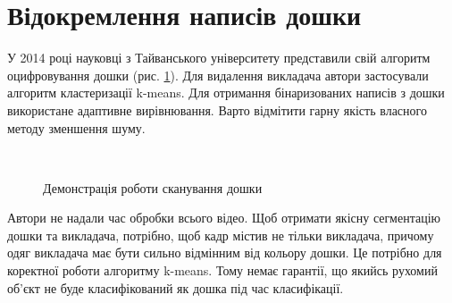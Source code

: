 \section{Відокремлення написів дошки}
У 2014 році науковці з Тайванського університету представили свій алгоритм \cite{yeh}
оцифровування дошки (рис. \ref{fig:yeh}). Для видалення викладача автори застосували
алгоритм кластеризації k-means. Для отримання бінаризованих написів з дошки
використане адаптивне вирівнювання. Варто відмітити гарну
якість власного методу зменшення шуму.
\begin{figure}[H]
  \centering
  \\
  \caption{Демонстрація роботи сканування дошки \cite{yeh}
    \label{fig:yeh}
  }
\end{figure}
Автори не надали час обробки всього відео. Щоб отримати якісну сегментацію
дошки та викладача, потрібно, щоб кадр містив не тільки викладача, причому одяг викладача
має бути сильно відмінним від кольору дошки. Це потрібно для коректної роботи алгоритму k-means.
Тому немає гарантії, що якийсь рухомий об'єкт не буде класифікований як дошка під час класифікації.


